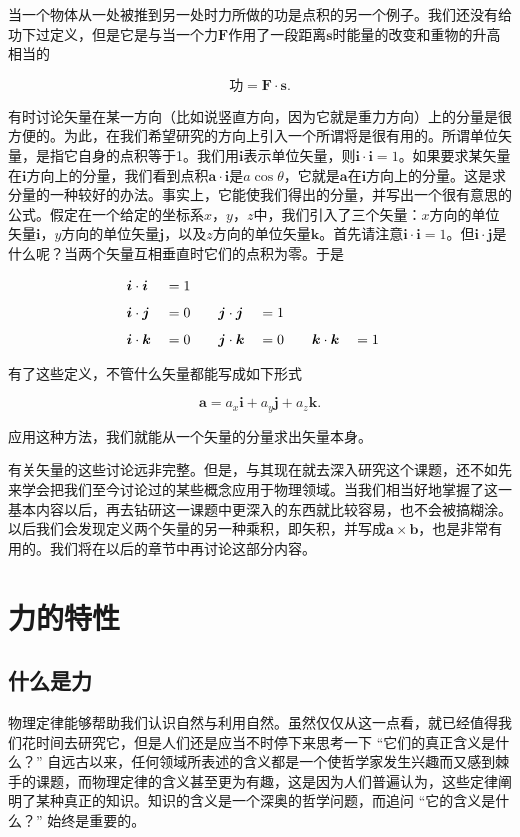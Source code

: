 \documentclass[12pt,oneside]{book}
\providecommand{\FLPvec}[1]{\boldsymbol{#1}}
\providecommand{\FLPF}[0]{\FLPvec{F}}
\providecommand{\FLPa}[0]{\FLPvec{a}}
\providecommand{\FLPb}[0]{\FLPvec{b}}
\providecommand{\FLPi}[0]{\FLPvec{i}}
\providecommand{\FLPj}[0]{\FLPvec{j}}
\providecommand{\FLPk}[0]{\FLPvec{k}}
\providecommand{\FLPs}[0]{\FLPvec{s}}
\begin{document}
当一个物体从一处被推到另一处时力所做的功是点积的另一个例子。我们还没有给功下过定义，但是它是与当一个力$ \FLPF $作用了一段距离$ \FLPs $时能量的改变和重物的升高相当的

\begin{equation}
\label{Eq:I:11:23}
\text{功}=\FLPF\cdot\FLPs.
\end{equation}


有时讨论矢量在某一方向（比如说竖直方向，因为它就是重力方向）上的分量是很方便的。为此，在我们希望研究的方向上引入一个所谓将是很有用的。所谓单位矢量，是指它自身的点积等于1。我们用$ \FLPi $表示单位矢量，则$ \FLPi\cdot\FLPi = 1 $。如果要求某矢量在$ \FLPi $方向上的分量，我们看到点积$ \FLPa\cdot\FLPi $是$ a\cos\theta $，它就是$ \FLPa $在$ \FLPi $方向上的分量。这是求分量的一种较好的办法。事实上，它能使我们得出的分量，并写出一个很有意思的公式。假定在一个给定的坐标系$ x $，$ y $，$ z $中，我们引入了三个矢量：$ x $方向的单位矢量$ \FLPi $，$ y $方向的单位矢量$ \FLPj $，以及$ z $方向的单位矢量$ \FLPk $。首先请注意$ \FLPi\cdot\FLPi = 1 $。但$ \FLPi\cdot\FLPj $是什么呢？当两个矢量互相垂直时它们的点积为零。于是

\begin{alignat}{6}
&\FLPi\cdot\FLPi&&=1\notag\\[1ex]
&\FLPi\cdot\FLPj&&=0&\quad
&\FLPj\cdot\FLPj&&=1\notag\\[1ex]
\label{Eq:I:11:24}
&\FLPi\cdot\FLPk&&=0&\quad
&\FLPj\cdot\FLPk&&=0&\quad
&\FLPk\cdot\FLPk&&=1
\end{alignat}

有了这些定义，不管什么矢量都能写成如下形式

\begin{equation}
\label{Eq:I:11:25}
\FLPa=a_x\FLPi+a_y\FLPj+a_z\FLPk.
\end{equation}

应用这种方法，我们就能从一个矢量的分量求出矢量本身。

有关矢量的这些讨论远非完整。但是，与其现在就去深入研究这个课题，还不如先来学会把我们至今讨论过的某些概念应用于物理领域。当我们相当好地掌握了这一基本内容以后，再去钻研这一课题中更深入的东西就比较容易，也不会被搞糊涂。以后我们会发现定义两个矢量的另一种乘积，即矢积，并写成$ \FLPa\times\FLPb $，也是非常有用的。我们将在以后的章节中再讨论这部分内容。


\chapter{力的特性}
\section{什么是力}
物理定律能够帮助我们认识自然与利用自然。虽然仅仅从这一点看，就已经值得我们花时间去研究它，但是人们还是应当不时停下来思考一下 “它们的真正含义是什么？” 自远古以来，任何领域所表述的含义都是一个使哲学家发生兴趣而又感到棘手的课题，而物理定律的含义甚至更为有趣，这是因为人们普遍认为，这些定律阐明了某种真正的知识。知识的含义是一个深奥的哲学问题，而追问 “它的含义是什么？” 始终是重要的。
\end{document}
